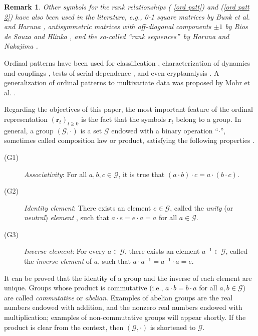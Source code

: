\documentclass[%
 aip,
 amsmath,amssymb,
 reprint,%
]{revtex4-1}
\newtheorem{remark}[theorem]{Remark}
\begin{document}
\begin{remark}
\label{RemarkAlternativeSymbols}Other symbols for the rank relationships (%
\ref{ord patt}) and (\ref{ord patt 2}) have also been used in the
literature, e.g., 0-1 square matrices by Bunk et al. \cite{Bunk2013} and
Haruna \cite{Haruna2019}, antisymmetric matrices with off-diagonal
components $\pm 1$ by Rios de Souza and Hlinka \cite{RiosSouza2022}, and the
so-called \textquotedblleft rank sequences\textquotedblright\ by Haruna and
Nakajima \cite{Haruna2011}.
\end{remark}

Ordinal patterns have been used for classification \cite%
{Keller2003,Parlitz2012}, characterization of dynamics and couplings \cite%
{Bandt2002,Monetti2009,Parlitz2013}, tests of serial dependence \cite%
{Canovas2011,Weiss2022,Weiss2022B}, and even cryptanalysis \cite%
{Arroyo2009}. A generalization of ordinal patterns to multivariate data
was proposed by Mohr et al. \cite{Mohr2020}.

Regarding the objectives of this paper, the most important feature of the
ordinal representation $(\mathbf{r}_{t})_{t\geq 0}$ is the fact that the
symbols $\mathbf{r}_{t}$ belong to a group. In general, a group $(\mathcal{G}%
,\cdot )$ is a set $\mathcal{G}$ endowed with a binary operation
\textquotedblleft $\cdot $\textquotedblright , sometimes called composition
law or product, satisfying the following properties \cite%
{Lang2005,Fraleigh2013}.

\begin{description}
\item[(G1)] \textit{Associativity}: For all $a,b,c\in \mathcal{G}$, it is
true that $(a\cdot b)\cdot c=a\cdot (b\cdot c)$.

\item[(G2)] \textit{Identity element}: There exists an element $e\in 
\mathcal{G}$, called the \textit{unity} (or \textit{neutral}) \textit{element%
}, such that $a\cdot e=e\cdot a=a$ for all $a\in \mathcal{G}$.

\item[(G3)] \textit{Inverse element}: For every $a\in \mathcal{G}$, there
exists an element $a^{-1}\in \mathcal{G}$, called the \textit{inverse element%
} of $a$, such that $a\cdot a^{-1}=a^{-1}\cdot a=e$.
\end{description}

It can be proved that the identity of a group and the inverse of each
element are unique. Groups whose product is commutative (i.e., $a\cdot
b=b\cdot a$ for all $a,b\in \mathcal{G}$) are called \textit{commutative} or 
\textit{abelian}. Examples of abelian groups are the real numbers endowed
with addition, and the nonzero real numbers endowed with multiplication;
examples of non-commutative groups will appear shortly. If the product is
clear from the context, then $(\mathcal{G},\cdot )$ is shortened to $%
\mathcal{G}$.
\end{document}

